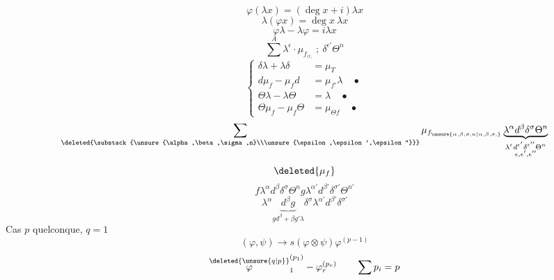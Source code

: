 \[
\varphi(\lambda x)=(\deg x+i)\lambda x
\]
\[
\lambda(\varphi x)=\deg x\ \lambda x
\]
\[
\varphi\lambda-\lambda\varphi=i\lambda x
\]
\[
\overset{A}{\sum}\lambda^\epsilon\cdot
\mu_{f_{(\epsilon,}}\ ;\ \delta^{\epsilon'}\Theta^n
\]
\[
\left\{\begin{aligned}
\delta\lambda+\lambda\delta&=\mu_T\\
d\mu_f-\mu_f d&=\mu_{f'}\lambda\quad\bullet\\
\Theta\lambda-\lambda\Theta&=\lambda\quad\bullet\\
\Theta\mu_f-\mu_f\Theta&=\mu_{\Theta f}\quad\bullet
\end{aligned}\right.
\]
\[
\sum_{\deleted{\substack{\unsure{\alpha,\beta,\sigma,n}\\\unsure{\epsilon,\epsilon',\epsilon''}}}}
\mu_{f_{\unsure{\alpha,\beta,\sigma,n|\alpha,\beta,\sigma,}}}
\underbrace{\lambda^\alpha d^\beta\delta^\sigma\Theta^n}_{
\substack{\lambda^\epsilon d^{\epsilon'}\delta^{\epsilon''}\Theta^n\\
\epsilon,\epsilon',\epsilon''}}
\]
\[
\deleted{\mu_f}
\]
\[
f\lambda^\alpha d^\beta\delta^\sigma\Theta^n
g\lambda^{\alpha'}d^{\beta'}\delta^{\sigma'}\Theta^{n'}
\]
\[
\lambda^\alpha\underbrace{d^\beta g}_{g d^\beta+\beta g'\lambda}
\delta^\sigma\lambda^{\alpha'}d^{\beta'}\delta^{\sigma'}
\]
Cas $p$ quelconque, $q=1$
\diagram{\begin{tikzcd}
\Gamma^{*+}\Phi_*\otimes\Lambda^{\deleted{\unsure{\epsilon}}\inserted{*}}\Psi_*\arrow[d]\\
\Gamma^{*+}\Phi_*\otimes\Lambda^*\Phi_*
\end{tikzcd}}
\[
(\varphi,\psi)\longrightarrow s(\varphi\otimes\psi)\varphi^{(p-1)}
\]
\[
\overset{\deleted{\unsure{q|p}}}{\varphi}_1^{(p_1)}-\varphi_r^{(p_r)}\qquad\sum p_i=p
\]
